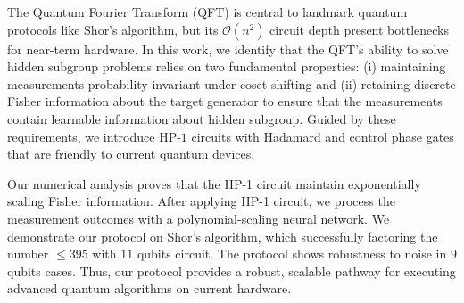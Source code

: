 



The Quantum Fourier Transform (QFT) is central to landmark quantum protocols like Shor's algorithm, but its $\mathcal{O}(n^2)$ circuit depth present bottlenecks for near-term hardware. In this work, we identify that the QFT's ability to solve hidden subgroup problems relies on two fundamental properties: (i) maintaining measurements probability invariant under coset shifting and (ii) retaining discrete Fisher information about the target generator to ensure that the measurements contain learnable information about hidden subgroup. Guided by these requirements, we introduce HP-$1$ circuits with Hadamard and control phase gates that are friendly to current quantum devices.

Our numerical analysis proves that the HP-1 circuit maintain exponentially scaling Fisher information. After applying HP-1 circuit, we process the measurement outcomes with a polynomial-scaling neural network. We demonstrate our protocol on  Shor's algorithm, which successfully factoring the number $\leq 395$ with $11$ qubits circuit. The protocol shows robustness to noise in $9$ qubits cases. Thus, our protocol provides a robust, scalable pathway for executing advanced quantum algorithms on current hardware.

